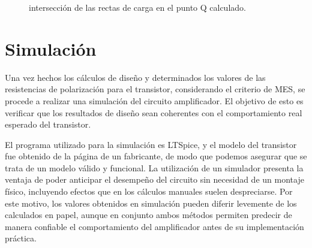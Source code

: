 \begin{figure}[!ht]
  \centering
  \begin{minipage}{0.45\textwidth}
  \end{minipage}
  \caption{intersección de las rectas de carga en el punto Q calculado.}
\end{figure}

\section{Simulación}

Una vez hechos los cálculos de diseño y determinados los valores de las resistencias de polarización para el transistor,
considerando el criterio de MES, se procede a realizar una simulación del circuito amplificador. El objetivo de esto es
verificar que los resultados de diseño sean coherentes con el comportamiento real esperado del transistor.

El programa utilizado para la simulación es LTSpice, y el modelo del transistor fue obtenido de la página de un
fabricante, de modo que podemos asegurar que se trata de un modelo válido y funcional. La utilización de un simulador
presenta la ventaja de poder anticipar el desempeño del circuito sin necesidad de un montaje físico, incluyendo
efectos que en los cálculos manuales suelen despreciarse. Por este motivo, los valores obtenidos en simulación pueden
diferir levemente de los calculados en papel, aunque en conjunto ambos métodos permiten predecir de manera confiable el
comportamiento del amplificador antes de su implementación práctica.


